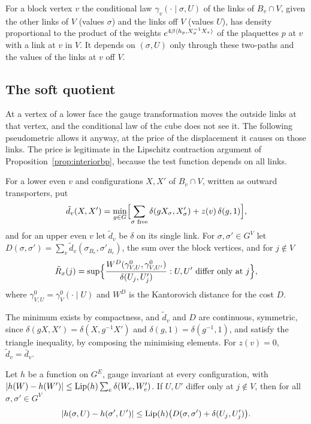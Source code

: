 For a block vertex $v$ the conditional law $\gamma_v(\cdot\mid\sigma,U)$ of
the links of $B_v\cap V$, given the other links of $V$ (values $\sigma$) and
the links off $V$ (values $U$), has density proportional to the product of
the weights $e^{4\beta\langle h_p,X_\sigma^{-1}X_\tau\rangle}$ of the plaquettes $p$ at
$v$ with a link at $v$ in $V$. It depends on $(\sigma,U)$ only through these
two-paths and the values of the links at $v$ off $V$.

\subsection{The soft quotient}

At a vertex of a lower face the gauge transformation moves the outside links
at that vertex, and the conditional law of the cube does not see it. The
following pseudometric allows it anyway, at the price of the displacement it
causes on those links. The price is legitimate in the Lipschitz contraction
argument of Proposition~\ref{prop:interiorbp}, because the test function
depends on all links.

\begin{definition}\label{def:dtilde}
For a lower even $v$ and configurations $X,X'$ of $B_v\cap V$, written as
outward transporters, put
\[
\tilde d_v(X,X')=\min_{g\in G}\Bigl[\sum_{\sigma\text{ free}}\delta(gX_\sigma,
X'_\sigma)+z(v)\,\delta(g,1)\Bigr],
\]
and for an upper even $v$ let $\tilde d_v$ be $\delta$ on its single link. For
$\sigma,\sigma'\in G^V$ let $D(\sigma,\sigma')=\sum_v\tilde d_v(\sigma_{B_v},
\sigma'_{B_v})$, the sum over the block vertices, and for $j\notin V$
\[
\tilde R_x(j)=\sup\Bigl\{\frac{W^D(\gamma^0_{V,U},\gamma^0_{V,U'})}
{\delta(U_j,U'_j)}:U,U'\text{ differ only at }j\Bigr\},
\]
where $\gamma^0_{V,U}=\gamma^0_V(\cdot\mid U)$ and $W^D$ is the Kantorovich
distance for the cost $D$.
\end{definition}

The minimum exists by compactness, and $\tilde d_v$ and $D$ are continuous,
symmetric, since $\delta(gX,X')=\delta(X,g^{-1}X')$ and
$\delta(g,1)=\delta(g^{-1},1)$, and satisfy the triangle inequality, by
composing the minimising elements. For $z(v)=0$, $\tilde d_v=\bar d_v$.

\begin{lemma}\label{lem:softlip}
Let $h$ be a function on $G^E$, gauge invariant at every configuration, with
$|h(W)-h(W')|\le\operatorname{Lip}(h)\sum_e\delta(W_e,W'_e)$. If $U,U'$ differ only at
$j\notin V$, then for all $\sigma,\sigma'\in G^V$
\[
|h(\sigma,U)-h(\sigma',U')|\le\operatorname{Lip}(h)\bigl(D(\sigma,\sigma')+\delta(U_j,U'_j)
\bigr).
\]
\end{lemma}

